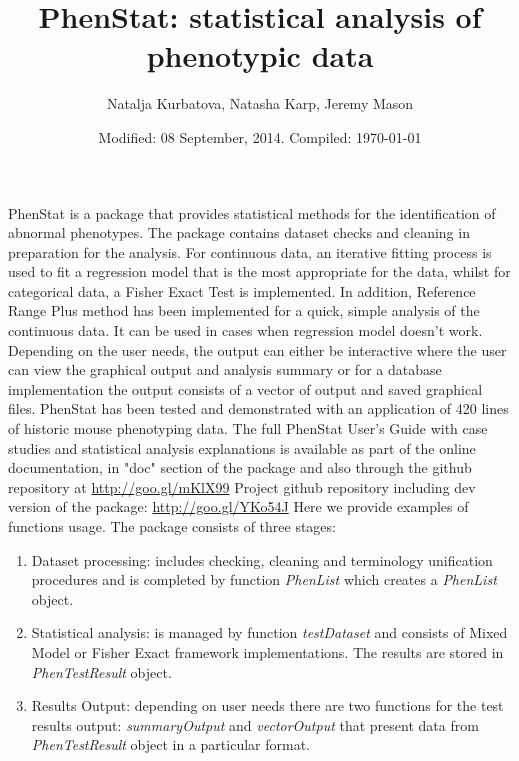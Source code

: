 \documentclass[a4paper]{article}
\begin{document}



\title{PhenStat: statistical analysis of phenotypic data}
\author{Natalja Kurbatova, Natasha Karp, Jeremy Mason}
\date{Modified: 08 September, 2014. Compiled: \today}

\maketitle

PhenStat is a package that provides statistical methods for the identification of abnormal phenotypes. 
The package contains dataset checks and cleaning in preparation for the analysis. For continuous data, an iterative fitting process is used to fit a regression model that is the most appropriate for the data, whilst for categorical data, a Fisher Exact Test is implemented. In addition, Reference Range Plus method has been implemented for a quick, simple analysis of the continuous data. It can be used in cases when regression model doesn't work.
\newline\newline
Depending on the user needs, the output can either be interactive where the user can view the graphical output and analysis summary or for a database implementation the output consists of a vector of output and saved graphical files. 
PhenStat has been tested and demonstrated with an application of 420 lines of historic mouse phenotyping data. 
\newline\newline
The full PhenStat User's Guide with case studies and statistical analysis explanations is available as part of the online documentation, in "doc" section of the package and also through the github repository at \url{http://goo.gl/mKlX99}
\newline\newline
Project github repository including dev version of the package: \url{http://goo.gl/YKo54J} 
\newline\newline
Here we provide examples of functions usage. The package consists of three stages:
\begin{enumerate}
\item Dataset processing: includes checking, cleaning and terminology unification procedures and is completed by function \textit{PhenList} which creates a \textit{PhenList} object. 
\item Statistical analysis: is managed by function \textit{testDataset} and consists of Mixed Model or Fisher Exact framework implementations. The results are stored in \textit{PhenTestResult} object. 
\item Results Output: depending on user needs there are two functions for the test results output: \textit{summaryOutput} 
and \textit{vectorOutput} that present data from \textit{PhenTestResult} object in a particular format. 
\end{enumerate}
\end{document}
